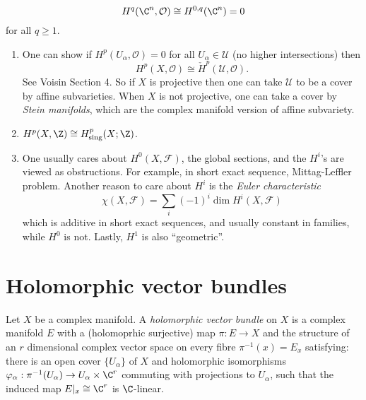 \documentclass[a4paper]{article}
\begin{document}
\begin{eg}
  \[
    H^q(\C^n, \mathcal O) \cong H^{0, q}(\C^n) = 0
  \]
  for all \(q \geq 1\).
\end{eg}

\begin{remark}\leavevmode
  \begin{enumerate}
  \item One can show if \(H^p(U_\alpha, \mathcal O) = 0\) for all \(U_\alpha \in \mathcal U\) (no higher intersections) then
    \[
      H^p(X, \mathcal O) \cong \check H^p(\mathcal U, \mathcal O).
    \]
    See Voisin Section 4. So if \(X\) is projective then one can take \(\mathcal U\) to be a cover by affine subvarieties. When \(X\) is not projective, one can take a cover by \emph{Stein manifolds}, which are the complex manifold version of affine subvariety.
  \item \(H^p(X, \Z) \cong H^p_{\text{sing}}(X; \Z)\).
  \item One usually cares about \(H^0(X, \mathcal F)\), the global sections, and the \(H^i\)'s are viewed as obstructions. For example, in short exact sequence, Mittag-Leffler problem. Another reason to care about \(H^i\) is the \emph{Euler characteristic}
    \[
      \chi(X, \mathcal F) = \sum_i (-1)^i \dim H^i(X, \mathcal F)
    \]
    which is additive in short exact sequences, and usually constant in families, while \(H^0\) is not. Lastly, \(H^1\) is also ``geometric''.
  \end{enumerate}
\end{remark}

\section{Holomorphic vector bundles}

\begin{definition}
  Let \(X\) be a complex manifold. A \emph{holomorphic vector bundle} on \(X\) is a complex manifold \(E\) with a (holomoprhic surjective) map \(\pi: E \to X\) and the structure of an \(r\) dimensional complex vector space on every fibre \(\pi^{-1}(x) = E_x\) satisfying: there is an open cover \(\{U_\alpha\}\) of \(X\) and holomorphic isomorphisms \(\varphi_\alpha: \pi^{-1}(U_\alpha) \to U_\alpha \times \C^r\) commuting with projections to \(U_\alpha\), such that the induced map \(E|_x \cong \C^r\) is \(\C\)-linear.
\end{definition}
\end{document}
